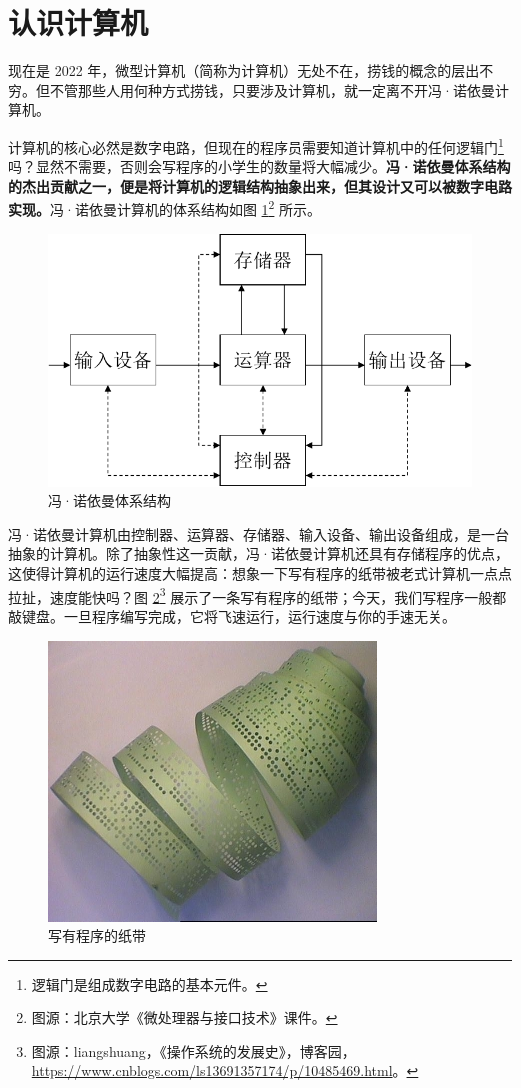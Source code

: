 
\section{认识计算机}

现在是 2022 年，微型计算机（简称为计算机）无处不在，捞钱的概念的层出不穷。但不管那些人用何种方式捞钱，只要涉及计算机，就一定离不开冯·诺依曼计算机。

计算机的核心必然是数字电路，但现在的程序员需要知道计算机中的任何逻辑门\footnote{逻辑门是组成数字电路的基本元件。}吗？显然不需要，否则会写程序的小学生的数量将大幅减少。\textbf{冯·诺依曼体系结构的杰出贡献之一，便是将计算机的逻辑结构抽象出来，但其设计又可以被数字电路实现。}冯·诺依曼计算机的体系结构如图 \ref{pic:logic-computer}\footnote{图源：北京大学《微处理器与接口技术》课件。} 所示。

\begin{figure}[H]
	\centering
	\includegraphics[width=0.45\linewidth]{pic/logic-computer.pdf}
	\caption{冯·诺依曼体系结构}
	\label{pic:logic-computer}
\end{figure}

冯·诺依曼计算机由控制器、运算器、存储器、输入设备、输出设备组成，是一台抽象的计算机。除了抽象性这一贡献，冯·诺依曼计算机还具有存储程序的优点，这使得计算机的运行速度大幅提高：想象一下写有程序的纸带被老式计算机一点点拉扯，速度能快吗？图 \ref{pic:paper-tape}\footnote{图源：liangshuang，《操作系统的发展史》，博客园，\url{https://www.cnblogs.com/ls13691357174/p/10485469.html}。} 展示了一条写有程序的纸带；今天，我们写程序一般都敲键盘。一旦程序编写完成，它将飞速运行，运行速度与你的手速无关。

\begin{figure}[ht]
	\centering
	\includegraphics[width=0.5\linewidth]{pic/paper-tape.png}
	\caption{写有程序的纸带}
	\label{pic:paper-tape}
\end{figure}

